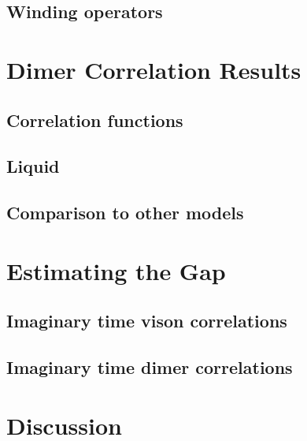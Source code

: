 \documentclass[aps,floatfix,11pt,twocolumn]{revtex4-1}
\begin{document}
    \subsection{Winding operators}

\section{Dimer Correlation Results}
    \subsection{Correlation functions}

    \subsection{Liquid}

    \subsection{Comparison to other models}

\section{Estimating the Gap}
    \subsection{Imaginary time vison correlations}

    \subsection{Imaginary time dimer correlations}

\section{Discussion}
\end{document}
